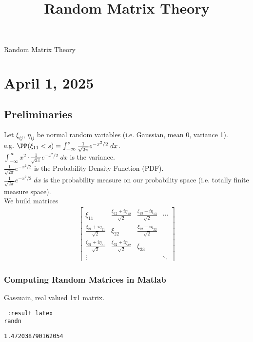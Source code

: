 \documentclass[11pt]{article}
\date{}
\title{Random Matrix Theory}
\begin{document}
{\centering
{\LARGE Random Matrix Theory \par }}
\section*{April 1, 2025}
\label{sec:orgea80da7}
\subsection*{Preliminaries}
\label{sec:org664fafc}
Let \(\xi_{ij}\), \(\eta_{ij}\) be normal random variables (i.e. Gaussian, mean 0, variance 1).\\
e.g. \(\PP(\xi_{11}<s)=\int_{-\infty}^{s}\frac{1}{\sqrt{2\pi}}e^{-x^{2}/2}\;dx\).\\
\(\int_{-\infty}^{\infty}x^{2}\cdot\frac{1}{\sqrt{2\pi}}e^{-x^{2}/2}\;dx\) is the variance.\\
\(\frac{1}{\sqrt{2\pi}}e^{-x^{2}/2}\) is the Probability Density Function (PDF).\\
\(\frac{1}{\sqrt{2\pi}}e^{-x^{2}/2}\;dx\) is the probability measure on our probability space (i.e. totally finite measure space).\\
We build matrices\\
\begin{align*}
  \begin{bmatrix}
    \xi_{11} & \frac{\xi_{12}+i\eta_{12}}{\sqrt{2}} & \frac{\xi_{13}+i\eta_{13}}{\sqrt{2}} & \cdots \\
    \frac{\xi_{21}+i\eta_{21}}{\sqrt{2}} & \xi_{22} & \frac{\xi_{22}+i\eta_{22}}{\sqrt{2}} \\
    \frac{\xi_{31}+i\eta_{31}}{\sqrt{2}} & \frac{\xi_{32}+i\eta_{32}}{\sqrt{2}} &  \xi_{33} \\
    \vdots & & & \ddots
  \end{bmatrix}
\end{align*}
\subsubsection*{Computing Random Matrices in Matlab}
\label{sec:org0749065}
Gassuain, real valued 1x1 matrix.\\
\begin{verbatim} :result latex
randn
\end{verbatim}

\label{}
\begin{verbatim}
1.472038790162054
\end{verbatim}
\end{document}

